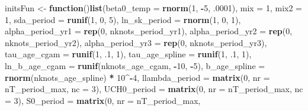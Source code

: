 \documentclass[11pt,]{article}
\newenvironment{Shaded}{\begin{snugshade}}{\end{snugshade}}
\newcommand{\KeywordTok}[1]{\textcolor[rgb]{0.13,0.29,0.53}{\textbf{#1}}}
\newcommand{\DataTypeTok}[1]{\textcolor[rgb]{0.13,0.29,0.53}{#1}}
\newcommand{\DecValTok}[1]{\textcolor[rgb]{0.00,0.00,0.81}{#1}}
\newcommand{\StringTok}[1]{\textcolor[rgb]{0.31,0.60,0.02}{#1}}
\newcommand{\ControlFlowTok}[1]{\textcolor[rgb]{0.13,0.29,0.53}{\textbf{#1}}}
\newcommand{\OperatorTok}[1]{\textcolor[rgb]{0.81,0.36,0.00}{\textbf{#1}}}
\newcommand{\NormalTok}[1]{#1}
\begin{document}
\begin{Shaded}
\begin{Highlighting}[]
\NormalTok{initsFun <-}\StringTok{ }\ControlFlowTok{function}\NormalTok{()}\KeywordTok{list}\NormalTok{(}\DataTypeTok{beta0_temp =} \KeywordTok{rnorm}\NormalTok{(}\DecValTok{1}\NormalTok{, }\OperatorTok{-}\DecValTok{5}\NormalTok{, .}\DecValTok{0001}\NormalTok{),}
                          \DataTypeTok{mix =} \DecValTok{1}\NormalTok{,}
                          \DataTypeTok{mix2 =} \DecValTok{1}\NormalTok{,}
                          \DataTypeTok{sda_period =} \KeywordTok{runif}\NormalTok{(}\DecValTok{1}\NormalTok{, }\DecValTok{0}\NormalTok{, }\DecValTok{5}\NormalTok{),}
                          \DataTypeTok{ln_sk_period =} \KeywordTok{rnorm}\NormalTok{(}\DecValTok{1}\NormalTok{, }\DecValTok{0}\NormalTok{, }\DecValTok{1}\NormalTok{),}
                          \DataTypeTok{alpha_period_yr1 =} \KeywordTok{rep}\NormalTok{(}\DecValTok{0}\NormalTok{, nknots_period_yr1),}
                          \DataTypeTok{alpha_period_yr2 =} \KeywordTok{rep}\NormalTok{(}\DecValTok{0}\NormalTok{, nknots_period_yr2),}
                          \DataTypeTok{alpha_period_yr3 =} \KeywordTok{rep}\NormalTok{(}\DecValTok{0}\NormalTok{, nknots_period_yr3),}
                          \DataTypeTok{tau_age_cgam =} \KeywordTok{runif}\NormalTok{(}\DecValTok{1}\NormalTok{, .}\DecValTok{1}\NormalTok{, }\DecValTok{1}\NormalTok{),}
                          \DataTypeTok{tau_age_spline =} \KeywordTok{runif}\NormalTok{(}\DecValTok{1}\NormalTok{, .}\DecValTok{1}\NormalTok{, }\DecValTok{1}\NormalTok{),}
                          \DataTypeTok{ln_b_age_cgam =} \KeywordTok{runif}\NormalTok{(nknots_age_cgam, }\OperatorTok{-}\DecValTok{10}\NormalTok{, }\OperatorTok{-}\DecValTok{5}\NormalTok{),}
                          \DataTypeTok{b_age_spline =} \KeywordTok{rnorm}\NormalTok{(nknots_age_spline) }\OperatorTok{*}\StringTok{ }\DecValTok{10}\OperatorTok{^-}\DecValTok{4}\NormalTok{,}
                          \DataTypeTok{llambda_period =} \KeywordTok{matrix}\NormalTok{(}\DecValTok{0}\NormalTok{,}
                                                  \DataTypeTok{nr =}\NormalTok{ nT_period_max,}
                                                  \DataTypeTok{nc =} \DecValTok{3}\NormalTok{),}
                          \DataTypeTok{UCH0_period =} \KeywordTok{matrix}\NormalTok{(}\DecValTok{0}\NormalTok{,}
                                               \DataTypeTok{nr =}\NormalTok{ nT_period_max,}
                                               \DataTypeTok{nc =} \DecValTok{3}\NormalTok{),}
                          \DataTypeTok{S0_period =} \KeywordTok{matrix}\NormalTok{(}\DecValTok{0}\NormalTok{,}
                                             \DataTypeTok{nr =}\NormalTok{ nT_period_max,}

\end{Highlighting}
\end{Shaded}
\end{document}
